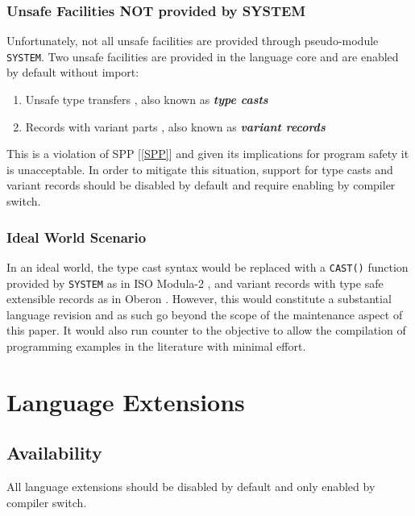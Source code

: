 \documentclass[10pt,a4paper]{article}
\renewcommand{\emph}[1]{\textbf{\textit{#1}}}
\begin{document}
\subsubsection{Unsafe Facilities NOT provided by SYSTEM}
Unfortunately, not all unsafe facilities are provided through pseudo-module
\verb|SYSTEM|. Two unsafe facilities are provided in the language core and are
enabled by default without import:

\begin{enumerate}[itemindent=-0.75em]
\item Unsafe type transfers \cite[p.119]{Wirth88}, also known as
\emph{type casts}
\item Records with variant parts \cite[p.71, p.138]{Wirth88}, also known as
\emph{variant records}
\end{enumerate}

\par\noindent This is a violation of SPP [\ref{SPP}] and given its implications
for program safety it is unacceptable. In order to mitigate this situation,
support for type casts and variant records should be disabled by default and
require enabling by compiler switch.

\subsubsection{Ideal World Scenario}

In an ideal world, the type cast syntax would be replaced with a \verb|CAST()|
function provided by \verb|SYSTEM| as in ISO Modula-2 \cite{ISO96}, and variant
records with type safe extensible records as in Oberon \cite{Wirth90}. However,
this would constitute a substantial language revision and as such go beyond the
scope of the maintenance aspect of this paper. It would also run counter to the
objective to allow the compilation of programming examples in the literature
with minimal effort.


\section{Language Extensions}

\subsection{Availability}
All language extensions should be disabled by default and only enabled by
compiler switch.
\end{document}

